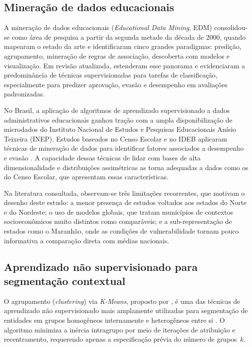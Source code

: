\subsection{Mineração de dados educacionais}

A mineração de dados educacionais (\textit{Educational Data Mining}, EDM) consolidou-se como área de pesquisa a partir da segunda metade da década de 2000, quando \citet{baker2010} mapearam o estado da arte e identificaram cinco grandes paradigmas: predição, agrupamento, mineração de regras de associação, descoberta com modelos e visualização. Em revisão atualizada, \citet{romero2020} estenderam esse panorama e evidenciaram a predominância de técnicas supervisionadas para tarefas de classificação, especialmente para predizer aprovação, evasão e desempenho em avaliações padronizadas.

No Brasil, a aplicação de algoritmos de aprendizado supervisionado a dados administrativos educacionais ganhou tração com a ampla disponibilização de microdados do Instituto Nacional de Estudos e Pesquisas Educacionais Anísio Teixeira (INEP). Estudos baseados no Censo Escolar e no IDEB aplicaram técnicas de mineração de dados para identificar fatores associados a desempenho e evasão \citep{colpani2018}. A capacidade dessas técnicas de lidar com bases de alta dimensionalidade e distribuições assimétricas as torna adequadas a dados como os do Censo Escolar, que apresentam essas características.

Na literatura consultada, observam-se três limitações recorrentes, que motivam o desenho deste estudo: a menor presença de estudos voltados aos estados do Norte e do Nordeste; o uso de modelos globais, que tratam municípios de contextos socioeconômicos muito distintos como comparáveis; e a sub-representação de estados como o Maranhão, onde as condições de vulnerabilidade tornam pouco informativa a comparação direta com médias nacionais.

\subsection{Aprendizado não supervisionado para segmentação contextual}

O agrupamento (\textit{clustering}) via \textit{K-Means}, proposto por \citet{macqueen1967}, é uma das técnicas de aprendizado não supervisionado mais amplamente utilizadas para segmentação de entidades em grupos homogêneos internamente e heterogêneos entre si \citep{faceli2021}. O algoritmo minimiza a inércia intragrupo por meio de iterações de atribuição e recentramento, requerendo apenas a especificação prévia do número de grupos~$k$.

